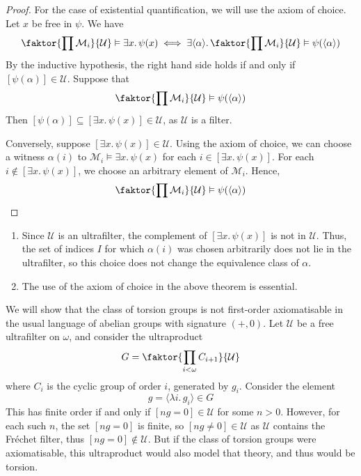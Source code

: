 \begin{proof}
    For the case of existential quantification, we will use the axiom of choice.
    Let \( x \) be free in \( \psi \).
    We have
    \[ \faktor{\prod \mathcal M_i}{\mathcal U} \vDash \exists x.\, \psi(x) \iff \exists \langle \alpha \rangle.\, \faktor{\prod \mathcal M_i}{\mathcal U} \vDash \psi(\langle \alpha \rangle) \]
    By the inductive hypothesis, the right hand side holds if and only if \( [\psi(\alpha)] \in \mathcal U \).
    Suppose that
    \[ \faktor{\prod \mathcal M_i}{\mathcal U} \vDash \psi(\langle \alpha \rangle) \]
    Then \( [\psi(\alpha)] \subseteq [\exists x.\, \psi(x)] \in \mathcal U \), as \( \mathcal U \) is a filter.
    
    Conversely, suppose \( [\exists x.\, \psi(x)] \in \mathcal U \).
    Using the axiom of choice, we can choose a witness \( \alpha(i) \) to \( \mathcal M_i \vDash \exists x.\, \psi(x) \) for each \( i \in [\exists x.\, \psi(x)] \).
    For each \( i \notin [\exists x.\, \psi(x)] \), we choose an arbitrary element of \( \mathcal M_i \).
    Hence,
    \[ \faktor{\prod \mathcal M_i}{\mathcal U} \vDash \psi(\langle \alpha \rangle) \]
\end{proof}
\begin{remark}
    \begin{enumerate}
        \item Since \( \mathcal U \) is an ultrafilter, the complement of \( [\exists x.\, \psi(x)] \) is not in \( \mathcal U \).
        Thus, the set of indices \( I \) for which \( \alpha(i) \) was chosen arbitrarily does not lie in the ultrafilter, so this choice does not change the equivalence class of \( \alpha \).
        \item The use of the axiom of choice in the above theorem is essential.
    \end{enumerate}
\end{remark}
\begin{example}
    We will show that the class of torsion groups is not first-order axiomatisable in the usual language of abelian groups with signature \( (+, 0) \).
    Let \( \mathcal U \) be a free ultrafilter on \( \omega \), and consider the ultraproduct
    \[ G = \faktor{\prod_{i < \omega} C_{i+1}}{\mathcal U} \]
    where \( C_i \) is the cyclic group of order \( i \), generated by \( g_i \).
    Consider the element
    \[ g = \langle \lambda i.\, g_i \rangle \in G \]
    This has finite order if and only if \( [ng = 0] \in \mathcal U \) for some \( n > 0 \).
    However, for each such \( n \), the set \( [ng = 0] \) is finite, so \( [ng \neq 0] \in \mathcal U \) as \( \mathcal U \) contains the Fr\'echet filter, thus \( [ng = 0] \notin \mathcal U \).
    But if the class of torsion groups were axiomatisable, this ultraproduct would also model that theory, and thus would be torsion.
\end{example}
